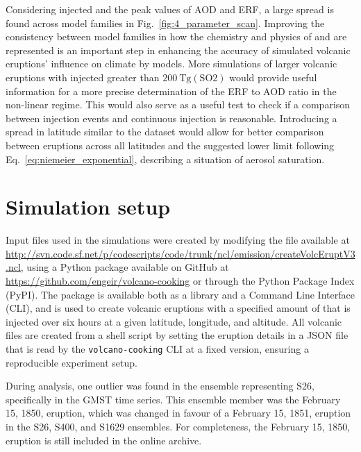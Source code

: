 \documentclass[draft]{agujournal2019}
\begin{document}
  Considering injected  and the peak values of AOD and ERF, a large spread is
  found across model families in Fig.~\ref{fig:4_parameter_scan}. Improving the
  consistency between model families in how the chemistry and physics of  and
   are represented is an important step in enhancing the accuracy of simulated
  volcanic eruptions' influence on climate by models. More simulations of larger
  volcanic eruptions with injected  greater than
  \(\SI{200}{\tera\gram(\mathrm{SO2})}\) would provide useful information for a more
  precise determination of the ERF to AOD ratio in the non-linear regime. This would
  also serve as a useful test to check if a comparison between  injection events
  and continuous  injection is reasonable. Introducing a spread in latitude
  similar to the  dataset would allow for better comparison
  between eruptions across all latitudes and the suggested lower limit following
  Eq.~\ref{eq:niemeier_exponential}, describing a situation of aerosol saturation.

  \appendix

  \section{Simulation setup}

  Input files used in the simulations were created by modifying the file available at \url{http://svn.code.sf.net/p/codescripts/code/trunk/ncl/emission/createVolcEruptV3.ncl},
  using a Python package available on GitHub at
  \url{https://github.com/engeir/volcano-cooking} or through the Python Package Index
  (PyPI). The package is available both as a library and a Command Line Interface (CLI),
  and is used to create volcanic eruptions with a specified amount of  that is
  injected over six hours at a given latitude, longitude, and altitude. All volcanic
   files are created from a shell script by setting the eruption details in a
  JSON file that is read by the \texttt{volcano-cooking} CLI at a fixed version,
  ensuring a reproducible experiment setup.

  During analysis, one outlier was found in the ensemble representing S26, specifically
  in the GMST time series. This ensemble member was the February 15, 1850, eruption,
  which was changed in favour of a February 15, 1851, eruption in the S26, S400, and
  S1629 ensembles. For completeness, the February 15, 1850, eruption is still included
  in the online archive.
\end{document}
